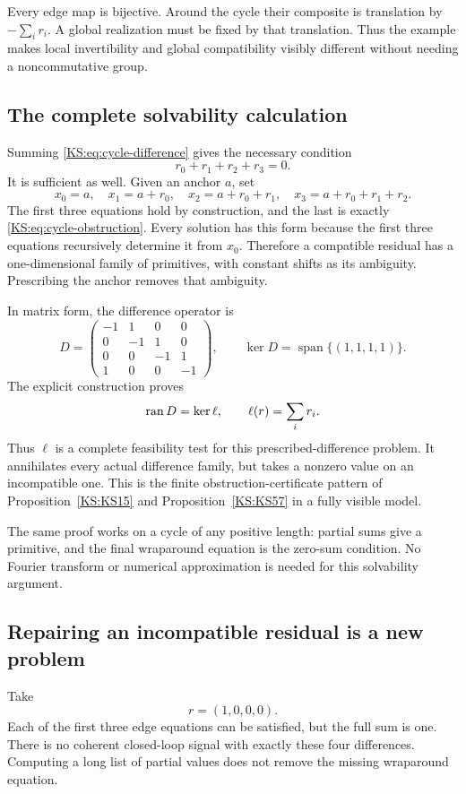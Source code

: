 Every edge map is bijective. Around the cycle their composite is translation by \(-\sum_i r_i\). A global realization must be fixed by that translation. Thus the example makes local invertibility and global compatibility visibly different without needing a noncommutative group.

\subsection{The complete solvability calculation}
Summing \eqref{KS:eq:cycle-difference} gives the necessary condition
\begin{equation}\label{KS:eq:cycle-obstruction}
 r_0+r_1+r_2+r_3=0.
\end{equation}
It is sufficient as well. Given an anchor \(a\), set
\[
 x_0=a,\quad x_1=a+r_0,\quad
 x_2=a+r_0+r_1,\quad x_3=a+r_0+r_1+r_2.
\]
The first three equations hold by construction, and the last is exactly \eqref{KS:eq:cycle-obstruction}. Every solution has this form because the first three equations recursively determine it from \(x_0\). Therefore a compatible residual has a one-dimensional family of primitives, with constant shifts as its ambiguity. Prescribing the anchor removes that ambiguity.

In matrix form, the difference operator is
\[
 D=\begin{pmatrix}
 -1&1&0&0\\
 0&-1&1&0\\
 0&0&-1&1\\
 1&0&0&-1
 \end{pmatrix},\qquad
 \ker D=\operatorname{span}\{(1,1,1,1)\}.
\]
The explicit construction proves
\[
 \operatorname{ran} D=\ker\ell,\qquad \ell(r)=\sum_i r_i.
\]
Thus \(\ell\) is a complete feasibility test for this prescribed-difference problem. It annihilates every actual difference family, but takes a nonzero value on an incompatible one. This is the finite obstruction-certificate pattern of Proposition~\ref{KS:KS15} and Proposition~\ref{KS:KS57} in a fully visible model.

The same proof works on a cycle of any positive length: partial sums give a primitive, and the final wraparound equation is the zero-sum condition. No Fourier transform or numerical approximation is needed for this solvability argument.

\subsection{Repairing an incompatible residual is a new problem}
Take
\[
 r=(1,0,0,0).
\]
Each of the first three edge equations can be satisfied, but the full sum is one. There is no coherent closed-loop signal with exactly these four differences. Computing a long list of partial values does not remove the missing wraparound equation.

